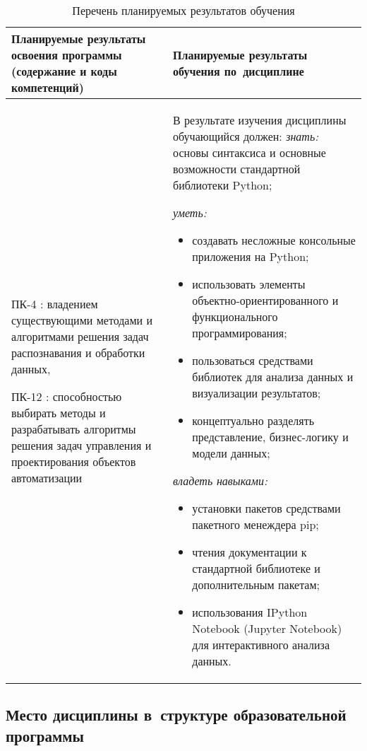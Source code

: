 \documentclass[a4paper,12pt]{article}
\begin{document}
\begin{longtable}{|p{45mm}|p{109mm}|}
  \caption{Перечень планируемых результатов обучения}\\
  \hline
  \centering
  Планируемые результаты освоения программы (содержание и коды компетенций) & 
  \centering\arraybackslash
  Планируемые результаты обучения по~дисциплине
  \\
  \hline
  
  ПК-4 : владением существующими методами и алгоритмами решения задач распознавания и обработки данных, \par 
  
  ПК-12 : способностью выбирать методы и разрабатывать алгоритмы решения задач управления и проектирования объектов автоматизации
  & 
  В результате изучения дисциплины обучающийся должен:\newline
  \emph{знать:}
  основы синтаксиса и основные возможности стандартной библиотеки Python;
  

  \emph{уметь:}
  \begin{itemize}[leftmargin=12pt]
    \item создавать несложные консольные приложения на Python; 
    \item использовать элементы объект\-но-ориен\-ти\-ро\-ван\-но\-го и функционального программирования; 
    \item пользоваться средствами библиотек для анализа данных и визуализации результатов; 
    \item концептуально разделять представление, бизнес-логику и модели данных; 
  \end{itemize}
  

  \emph{владеть навыками:}
  \begin{itemize}[leftmargin=12pt]
    \item установки пакетов средствами пакетного менеждера pip; 
    \item чтения документации к стандартной библиотеке и дополнительным пакетам; 
    \item использования IPython Notebook (Jupyter Notebook) для интерактивного анализа данных. 
  \end{itemize}
  
  \\
  \hline
  \end{longtable}


\subsection{Место дисциплины в~структуре образовательной программы}
\end{document}

